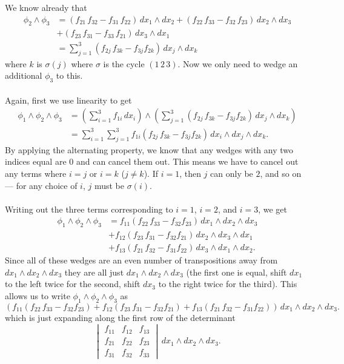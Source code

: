 \documentclass[12 pt, letterpaper]{hmcpset}
\begin{document}
\begin{solution}
	We know already that
	\[
		\begin{split}
		\phi_2 \wedge \phi_3 & = (f_{21} \, f_{32} - f_{31} \, f_{22}) \, dx_1 \wedge dx_2 + (f_{22} \, f_{33} - f_{32} \, f_{23}) \, dx_2 \wedge dx_3 \\
				     & + (f_{23} \, f_{31} - f_{33} \, f_{21}) \, dx_3 \wedge dx_1 \\
		& = \sum_{j = 1}^3 (f_{2j} \, f_{3k} - f_{3j} f_{2k}) \, dx_j \wedge dx_k
		\end{split}
	\]
	where $k$ is $\sigma(j)$ where $\sigma$ is the cycle $(1 \, 2 \, 3)$. Now we only need to wedge an additional $\phi_3$ to this. \\\\
	Again, first we use linearity to get
	\[
		\begin{split}
			\phi_1 \wedge \phi_2 \wedge \phi_3 & = \left ( \sum_{i = 1}^3 f_{1 i} \, dx_i \right ) \wedge \left ( \sum_{j = 1}^3 (f_{2j} \, f_{3k} - f_{3j} f_{2k}) \, dx_j \wedge dx_k \right ) \\
							   & = \sum_{i = 1}^3 \sum_{j = 1}^3 f_{1 i} (f_{2j} \, f_{3k} - f_{3j} f_{2k}) \, dx_i \wedge dx_j \wedge dx_k.
		\end{split}
	\]
	By applying the alternating property, we know that any wedges with any two indices equal are $0$ and can cancel them out. This means we have to cancel out any terms where $i = j$ or $i = k$ ($j \neq k$). If $i = 1$, then $j$ can only be $2$, and so on --- for any choice of $i$, $j$ must be $\sigma(i)$. \\\\
	Writing out the three terms corresponding to $i = 1$, $i = 2$, and $i = 3$, we get
	\[
		\begin{split}
			\phi_1 \wedge \phi_2 \wedge \phi_3 & = f_{1 1} (f_{2 2} \, f_{3 3} - f_{3 2} f_{2 3}) \, dx_1 \wedge dx_2 \wedge dx_3 \\ 
							   & + f_{1 2} (f_{2 3} \, f_{3 1} - f_{3 2} f_{2 1}) \, dx_2 \wedge dx_3 \wedge dx_1 \\
							   & + f_{1 3} (f_{2 1} \, f_{3 2} - f_{3 1} f_{2 2}) \, dx_3 \wedge dx_1 \wedge dx_2.
		\end{split}
	\]
	Since all of these wedges are an even number of transpositions away from $dx_1 \wedge dx_2 \wedge dx_3$ they are all just $dx_1 \wedge dx_2 \wedge dx_3$ (the first one is equal, shift $dx_1$ to the left twice for the second, shift $dx_3$ to the right twice for the third). This allows us to write $\phi_1 \wedge \phi_2 \wedge \phi_3$ as
	\[
		(f_{1 1} (f_{2 2} \, f_{3 3} - f_{3 2} f_{2 3}) + f_{1 2} (f_{2 3} \, f_{3 1} - f_{3 2} f_{2 1}) + f_{1 3} (f_{2 1} \, f_{3 2} - f_{3 1} f_{2 2})) \, dx_1 \wedge dx_2 \wedge dx_3.
	\]
	which is just expanding along the first row of the determinant
	\[
		\begin{vmatrix}
			f_{11} & f_{12} & f_{13} \\
			f_{21} & f_{22} & f_{23} \\
			f_{31} & f_{32} & f_{33}
		\end{vmatrix} \, dx_1 \wedge dx_2 \wedge dx_3.
	\]

\end{solution}
\end{document}

